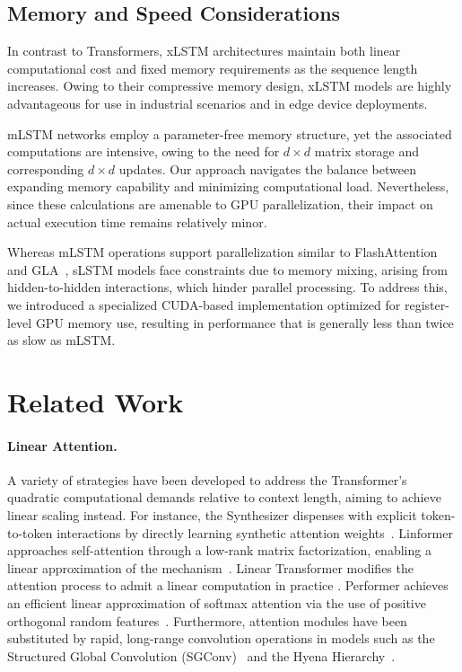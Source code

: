 \subsection{Memory and Speed Considerations}

In contrast to Transformers, xLSTM architectures maintain both linear computational cost and fixed memory requirements as the sequence length increases. Owing to their compressive memory design, xLSTM models are highly advantageous for use in industrial scenarios and in edge device deployments.

mLSTM networks employ a parameter-free memory structure, yet the associated computations are intensive, owing to the need for $d \times d$ matrix storage and corresponding $d \times d$ updates. Our approach navigates the balance between expanding memory capability and minimizing computational load. Nevertheless, since these calculations are amenable to GPU parallelization, their impact on actual execution time remains relatively minor.

Whereas mLSTM operations support parallelization similar to FlashAttention~\citep{Dao:22,Dao:23} and GLA~\citep{Yang:23arxiv}, sLSTM models face constraints due to memory mixing, arising from hidden-to-hidden interactions, which hinder parallel processing. To address this, we introduced a specialized CUDA-based implementation optimized for register-level GPU memory use, resulting in performance that is generally less than twice as slow as mLSTM.

\section{Related Work}
\label{sec:related}

\paragraph{Linear Attention.} A variety of strategies have been developed to address the Transformer's quadratic computational demands relative to context length, aiming to achieve linear scaling instead. For instance, the Synthesizer dispenses with explicit token-to-token interactions by directly learning synthetic attention weights~\citep{Tay:20arxiv}. Linformer approaches self-attention through a low-rank matrix factorization, enabling a linear approximation of the mechanism~\citep{Wang:20arxiv}. Linear Transformer modifies the attention process to admit a linear computation in practice \citep{Katharopoulos:20}. Performer achieves an efficient linear approximation of softmax attention via the use of positive orthogonal random features~\citep{Choromanski:21}. Furthermore, attention modules have been substituted by rapid, long-range convolution operations in models such as the Structured Global Convolution (SGConv)~\citep{Li:22} and the Hyena Hierarchy~\citep{Poli:23}.

